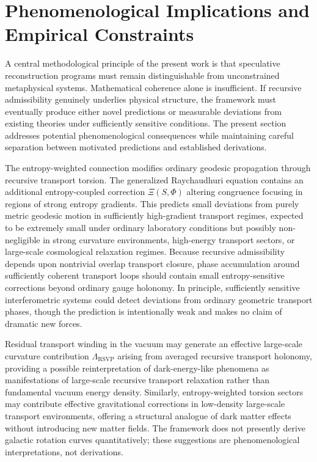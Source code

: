 \documentclass[12pt,a4paper]{article}
\newcommand{\RSVP}{\textrm{RSVP}}
\begin{document}
\section{Phenomenological Implications and Empirical Constraints}

A central methodological principle of the present work is that speculative
reconstruction programs must remain distinguishable from unconstrained
metaphysical systems. Mathematical coherence alone is insufficient. If recursive
admissibility genuinely underlies physical structure, the framework must
eventually produce either novel predictions or measurable deviations from
existing theories under sufficiently sensitive conditions. The present section
addresses potential phenomenological consequences while maintaining careful
separation between motivated predictions and established derivations.

The entropy-weighted connection modifies ordinary geodesic propagation through
recursive transport torsion. The generalized Raychaudhuri equation contains an
additional entropy-coupled correction $\Xi(S,\Phi)$ altering congruence focusing
in regions of strong entropy gradients. This predicts small deviations from
purely metric geodesic motion in sufficiently high-gradient transport regimes,
expected to be extremely small under ordinary laboratory conditions but possibly
non-negligible in strong curvature environments, high-energy transport sectors,
or large-scale cosmological relaxation regimes. Because recursive admissibility
depends upon nontrivial overlap transport closure, phase accumulation around
sufficiently coherent transport loops should contain small entropy-sensitive
corrections beyond ordinary gauge holonomy. In principle, sufficiently sensitive
interferometric systems could detect deviations from ordinary geometric transport
phases, though the prediction is intentionally weak and makes no claim of
dramatic new forces.

Residual transport winding in the vacuum may generate an effective large-scale
curvature contribution $\Lambda_\RSVP$ arising from averaged recursive transport
holonomy, providing a possible reinterpretation of dark-energy-like phenomena
as manifestations of large-scale recursive transport relaxation rather than
fundamental vacuum energy density. Similarly, entropy-weighted torsion sectors
may contribute effective gravitational corrections in low-density large-scale
transport environments, offering a structural analogue of dark matter effects
without introducing new matter fields. The framework does not presently derive
galactic rotation curves quantitatively; these suggestions are phenomenological
interpretations, not derivations.
\end{document}
